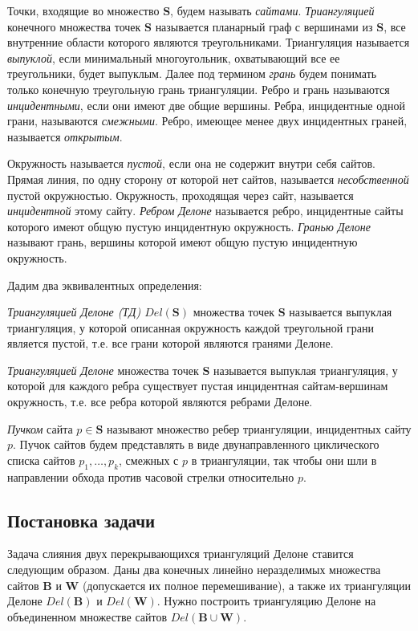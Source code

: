 \documentclass[12pt]{article}
\begin{document}
Точки, входящие во множество $\textbf{S}$, будем называть {\itshape сайтами}.
{\itshape Триангуляцией} конечного множества точек $\textbf{S}$ называется планарный граф с вершинами из $\textbf{S}$,
все внутренние области которого являются треугольниками.
Триангуляция называется {\itshape выпуклой}, если минимальный многоугольник, охватывающий все ее треугольники, будет выпуклым.
Далее под термином {\itshape грань} будем понимать только конечную треугольную грань триангуляции.
Ребро и грань называются {\itshape инцидентными}, если они имеют две общие вершины.
Ребра, инцидентные одной грани, называются {\itshape смежными}.
Ребро, имеющее менее двух инцидентных граней, называется {\itshape открытым}.

Окружность называется {\itshape пустой}, если она не содержит внутри себя сайтов.
Прямая линия, по одну сторону от которой нет сайтов, называется {\itshape несобственной} пустой окружностью.
Окружность, проходящая через сайт, называется {\itshape инцидентной} этому сайту.
{\itshape Ребром Делоне} называется ребро, инцидентные сайты которого имеют общую пустую инцидентную окружность.
{\itshape Гранью Делоне} называют грань, вершины которой имеют общую пустую инцидентную окружность.

Дадим два эквивалентных определения:

\begin{definition}
{\itshape Триангуляцией Делоне (ТД) $Del(\textbf{S})$} множества точек $\textbf{S}$ называется выпуклая триангуляция,
у которой описанная окружность каждой треугольной грани является пустой,
т.е. все грани которой являются гранями Делоне.
\end{definition}

\begin{definition}
{\itshape Триангуляцией Делоне} множества точек $\textbf{S}$ называется выпуклая триангуляция,
у которой для каждого ребра существует пустая инцидентная сайтам-вершинам окружность,
т.е. все ребра которой являются ребрами Делоне.
\end{definition}

{\itshape Пучком} сайта $p \in \textbf{S}$ называют множество ребер триангуляции, инцидентных сайту $p$.
Пучок сайтов будем представлять в виде двунаправленного циклического списка сайтов $p_1, \ldots, p_k$,
смежных с $p$ в триангуляции, так чтобы они шли в направлении обхода против часовой стрелки относительно $p$.

\subsection{Постановка задачи}
Задача слияния двух перекрывающихся триангуляций Делоне ставится следующим образом.
Даны два конечных линейно неразделимых множества сайтов $\textbf{B}$ и $\textbf{W}$ (допускается их полное перемешивание),
а также их триангуляции Делоне $Del(\textbf{B})$ и $Del(\textbf{W})$.
Нужно построить триангуляцию Делоне на объединенном множестве сайтов $Del(\textbf{B} \cup \textbf{W})$.
\end{document}
